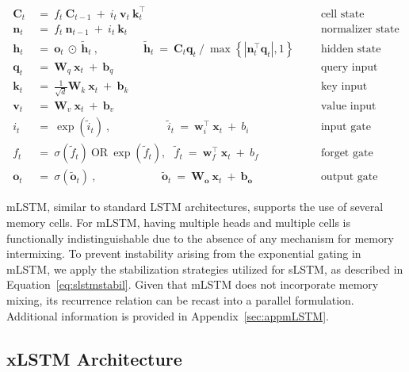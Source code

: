 \begin{align}
\label{eq:mlstm_recurrent_begin}
\mathbf{C}_t \ &= \  f_t \ \mathbf{C}_{t-1} \ + \ 
  i_t \ \mathbf{v}_t \ \mathbf{k}_t^\top & &  &\text{cell state} \\
\mathbf{n}_t \ &= \  f_t \ \mathbf{n}_{t-1} \ + \ 
  i_t \ \mathbf{k}_t & &  &\text{normalizer state} \\
\mathbf{h}_t  \ &= \ \mathbf{o}_t \ \odot \ \tilde{\mathbf{h}}_t
\ , \qquad \qquad 
\tilde{\mathbf{h}}_t \ = \   \mathbf{C}_t \mathbf{q}_t \ / \ 
  \max \left\{ |\mathbf{n}_t^\top \mathbf{q}_t|, 1 \right\} 
   &&&\text{hidden state} \\
\mathbf{q}_t \ &= \ \mathbf{W}_q \ \mathbf{x}_t \ + \ \mathbf{b}_q  & &  &\text{query input} \\
\mathbf{k}_t \ &= \ \frac{1}{\sqrt{d}} \mathbf{W}_k \ \mathbf{x}_t \ + \ \mathbf{b}_k  & &  &\text{key input} \\
\mathbf{v}_t \ &= \ \mathbf{W}_v \ \mathbf{x}_t \ + \ \mathbf{b}_v  & &  &\text{value input} \\
i_t \ &= \ \!\exp \!  \! \left( \tilde{i}_t  \right) \ , 
 \qquad \qquad \ \ \ \ \,
  \tilde{i}_t \ = \ \mathbf{w}^\top_{i} \ \mathbf{x}_t \ + \  b_{i} \ \ \ 
  &&&\text{input gate} \\
f_t \ &= \ \sigma \!  \left(  \tilde{f}_t \right) \ \text{OR} \ \!\exp \!  \! \left(  \tilde{f}_t \right) , \ \ \: \!
\tilde{f}_t \ = \ \mathbf{w}^\top_{f} \ \mathbf{x}_t  \ + \
  b_{f}
  &&& \text{forget gate} \\
\label{eq:mlstm_recurrent_end}
\mathbf{o}_t \ &= \ \sigma \left( \tilde{\mathbf{o}}_t \right) \ , \qquad \qquad \quad \ \ \ \,
  \tilde{\mathbf{o}}_t  \ = \ \mathbf{W}_{\mathbf{o}} \ \mathbf{x}_t \ + \
  \mathbf{b}_{\mathbf{o}}
  &&&\text{output gate} 
\end{align}

mLSTM, similar to standard LSTM architectures, supports the use of several memory cells. For mLSTM, having multiple heads and multiple cells is functionally indistinguishable due to the absence of any mechanism for memory intermixing. To prevent instability arising from the exponential gating in mLSTM, we apply the stabilization strategies utilized for sLSTM, as described in Equation~\ref{eq:slstmstabil}. Given that mLSTM does not incorporate memory mixing, its recurrence relation can be recast into a parallel formulation. Additional information is provided in Appendix~\ref{sec:appmLSTM}.

\subsection{xLSTM Architecture}
\label{sec:xLSTMarch}

